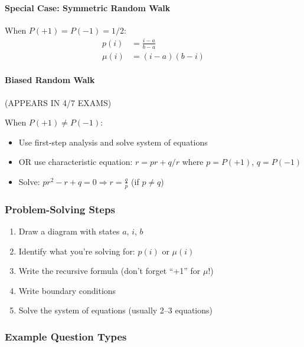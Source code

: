 \documentclass[11pt,letterpaper]{article}
\begin{document}
\paragraph{Special Case: Symmetric Random Walk}

When $P(+1) = P(-1) = 1/2$:
\begin{align*}
p(i) &= \frac{i - a}{b - a} \\
\mu(i) &= (i - a)(b - i)
\end{align*}

\paragraph{Biased Random Walk} \textcolor{highcolor}{(APPEARS IN 4/7 EXAMS)}

When $P(+1) \neq P(-1)$:
\begin{itemize}
  \item Use first-step analysis and solve system of equations
  \item OR use characteristic equation: $r = pr + q/r$ where $p = P(+1)$, $q = P(-1)$
  \item Solve: $pr^2 - r + q = 0 \Rightarrow r = \frac{q}{p}$ (if $p \neq q$)
\end{itemize}

\subsubsection{Problem-Solving Steps}

\begin{enumerate}[leftmargin=*]
  \item Draw a diagram with states $a$, $i$, $b$
  \item Identify what you're solving for: $p(i)$ or $\mu(i)$
  \item Write the recursive formula (don't forget ``+1'' for $\mu$!)
  \item Write boundary conditions
  \item Solve the system of equations (usually 2--3 equations)
\end{enumerate}

\subsubsection{Example Question Types}
\end{document}
